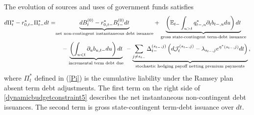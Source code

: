 \documentclass[12pt]{article}
\newcommand{\WJ}[1]{{\textcolor{red}{#1}}}
\begin{document}
The evolution of sources and uses of government funds satisfies %
\begin{align} \label{dynamicbudgetconstraint5}
d\Pi_t ^\ast -r_{0, t-}^\ast \Pi_{t-}^\ast dt  = &  {\underbrace{dB^{(0)}_t  -r_{0, t-}^\ast B^{(0)}_{t-} dt}_{\text{net non-contingent instantaneous debt issuance}}}   +  {\underbrace{ \left( \mathbb{E}_{t-}\int_{u> t} q^\ast_{t-, u}\partial_tb_{t-, u} du \right) dt}_{\text{gross state-contingent term-debt issuance}}}  \notag \\
 & \quad -{\underbrace{ \left(\int_{u<t} \partial_u b_{u, t-} du\right)dt}_{\text{incremental term debt due}}}  
\; - {\underbrace{\sum_{j\neq s_{t-}}\Delta_{t-}^{(s_{t-}, j)} \left(d {\mathcal J}_t^{(s_{t-}, j)}-\lambda_{s_{t-}, j}e^{\eta^*(s_{t-}, j)}d t \right)}_{\text{stochastic hedging payoff netting premium payments}} } \,, %
\end{align}
where $\Pi_t^*$ defined in (\ref{Pi}) is the cumulative liability  under the Ramsey plan absent  term debt adjustments. 
The first term on the right side of \eqref{dynamicbudgetconstraint5} describes the net instantaneous non-contingent debt issuances. 
The second term is  gross state-contingent term-debt issuance over  $dt$. %
\end{document}
